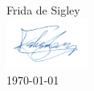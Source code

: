 Frida de Sigley\\
\includegraphics[width=0.2\textwidth]{figures/signature/Signature.jpg}\\
\today

 \begin{flushright}
 
\end{flushright}
